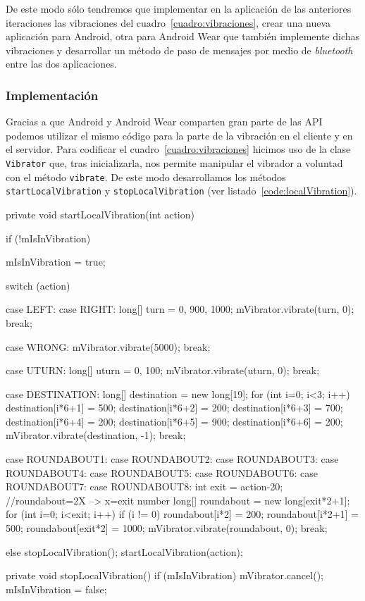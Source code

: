 De este modo sólo tendremos que implementar en la aplicación de las anteriores iteraciones las
vibraciones del cuadro~\ref{cuadro:vibraciones}, crear una nueva aplicación para Android, otra para
Android Wear que también implemente dichas vibraciones y desarrollar un método de paso de mensajes
por medio de \emph{bluetooth} entre las dos aplicaciones.

\subsubsection{Implementación}

Gracias a que Android y Android Wear comparten gran parte de las \acs{API} podemos utilizar el mismo
código para la parte de la vibración en el cliente y en el servidor. Para codificar el
cuadro~\ref{cuadro:vibraciones} hicimos uso de la clase \texttt{Vibrator} que, tras inicializarla,
nos permite manipular el vibrador a voluntad con el método \texttt{vibrate}. De este modo
desarrollamos los métodos \texttt{startLocalVibration} y \texttt{stopLocalVibration} (ver
listado~\ref{code:localVibration}).

\begin{listing}[
  float=ht,
  language = java,
  caption  = {Métodos usados para hacer vibrar el dispositivo con la clase \texttt{Vibrator}},
  label    = code:localVibration]
private void startLocalVibration(int action) {
  if (!mIsInVibration) {
    mIsInVibration = true;
    
    switch (action) {
      case LEFT:
      case RIGHT:
        long[] turn = {0, 900, 1000};
        mVibrator.vibrate(turn, 0);
        break;
		
      case WRONG:
        mVibrator.vibrate(5000);
        break;
				
      case UTURN:
        long[] uturn = {0, 100};
        mVibrator.vibrate(uturn, 0);
        break;
			
      case DESTINATION:
        long[] destination = new long[19];
        for (int i=0; i<3; i++) {
          destination[i*6+1] = 500;
          destination[i*6+2] = 200;
          destination[i*6+3] = 700;
          destination[i*6+4] = 200;
          destination[i*6+5] = 900;
          destination[i*6+6] = 200;
        }
        mVibrator.vibrate(destination, -1);
        break;

      case ROUNDABOUT1:  case ROUNDABOUT2:  case ROUNDABOUT3:
      case ROUNDABOUT4:  case ROUNDABOUT5:  case ROUNDABOUT6:
      case ROUNDABOUT7:  case ROUNDABOUT8:
        int exit = action-20; //roundabout=2X --> x=exit number
        long[] roundabout = new long[exit*2+1];
        for (int i=0; i<exit; i++) {
          if (i != 0) roundabout[i*2] = 200;
            roundabout[i*2+1] = 500;
          }
          roundabout[exit*2] = 1000;
          mVibrator.vibrate(roundabout, 0);
          break;
    }
  } else {
    stopLocalVibration();
    startLocalVibration(action);
  }
}
private void stopLocalVibration() {
  if (mIsInVibration) {
    mVibrator.cancel();
    mIsInVibration = false;
  }
}
\end{listing}

